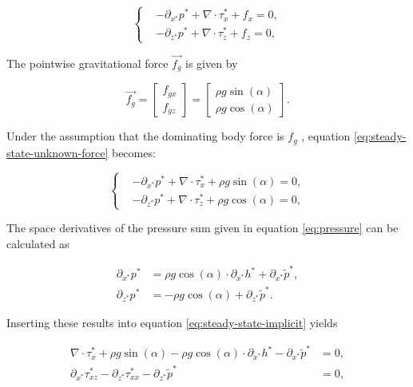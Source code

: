 \begin{equation} \label{eq:steady-state-unknown-force}
  \begin{cases}
    &-\partial_{x^*} p^* + \nabla \cdot \tau_x^* + f_x = 0, \\
    &-\partial_{z^*} p^* + \nabla \cdot \tau_z^* + f_z = 0,
  \end{cases}
\end{equation}

The pointwise gravitational force $\vec{f_g}$ is given by

\begin{equation}
  \vec{f_g} = \begin{bmatrix} f_{gx} \\ f_{gz} \end{bmatrix} = \begin{bmatrix} \rho g \sin(\alpha) \\ \rho g \cos(\alpha) \end{bmatrix}.
\end{equation}

Under the assumption that the dominating body force is $f_g$ , equation \eqref{eq:steady-state-unknown-force} becomes:

\begin{equation} \label{eq:steady-state-implicit}
  \begin{cases}
    &-\partial_{x^*} p^* + \nabla \cdot \tau_x^* + \rho g \sin(\alpha) = 0, \\
    &-\partial_{z^*} p^* + \nabla \cdot \tau_z^* + \rho g \cos(\alpha) = 0,
  \end{cases}
\end{equation}

The space derivatives of the pressure sum given in equation \eqref{eq:pressure} can be calculated as

\begin{equation} \label{eq:pressure-space-derivative}
  \begin{align}
  \partial_{x^*} p^* &= \rho g \cos(\alpha) \cdot \partial_{x^*} h^* + \partial_{x^*} \tilde{p}^*, \\
  \partial_{z^*} p^* &= - \rho g \cos(\alpha) + \partial_{z^*} \tilde{p}^*.
  \end{align}
\end{equation}

Inserting these results into equation \eqref{eq:steady-state-implicit} yields

\begin{equation} \label{eq:steady-state-explicit}
  \begin{align}
    \nabla \cdot \tau_x^* + \rho g \sin(\alpha) - \rho g \cos(\alpha) \cdot \partial_{x^*} h^* - \partial_{x^*} \tilde{p}^* &= 0, \\
    \partial_{x^*} \tau_{xz}^* - \partial_{z^*} \tau_{xx}^* - \partial_{z^*} \tilde{p}^* &= 0,
  \end{align}
\end{equation}
